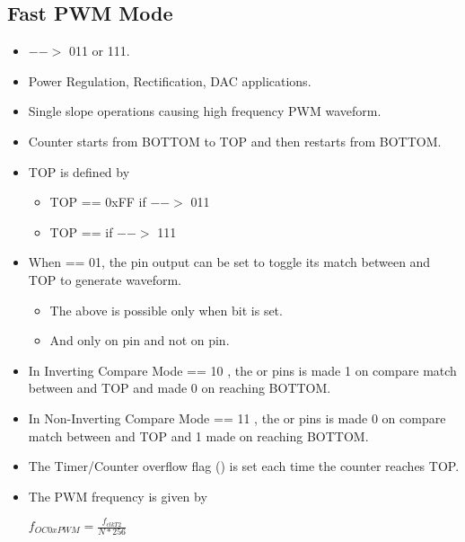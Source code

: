 \documentclass{article}
\begin{document}
\subsection{Fast PWM Mode}
\begin{itemize}
    \item {} $-->$ 011 or 111.
    \item Power Regulation, Rectification, DAC applications.
    \item Single slope operations causing high frequency PWM waveform.
    \item Counter starts from BOTTOM to TOP and then restarts from BOTTOM.
    \item TOP is defined by
    \begin{itemize}
        \item TOP == 0xFF if  $-->$ 011
        \item TOP ==  if  $-->$ 111
    \end{itemize}
    \item  When  == 01, the  pin output can be set to toggle its match between  and TOP to generate waveform.
    \begin{itemize}
        \item The above is possible only when  bit is set.
        \item And only on  pin and not on  pin.
    \end{itemize}
    \item In Inverting Compare Mode  == 10 , the  or  pins is made 1 on compare match between  and TOP and made 0 on reaching BOTTOM.
    \item In Non-Inverting Compare Mode  == 11 , the  or  pins is made 0 on compare match between  and TOP and 1 made  on reaching BOTTOM.
    \item The Timer/Counter overflow flag () is set each time the counter reaches TOP.
    \item The PWM frequency is given by 
    \begin{center}
        { \Large $f_{OC0xPWM} = \frac{f_{clkT2}}{N * 256}$ }
    \end{center}
\end{itemize}
\end{document}
